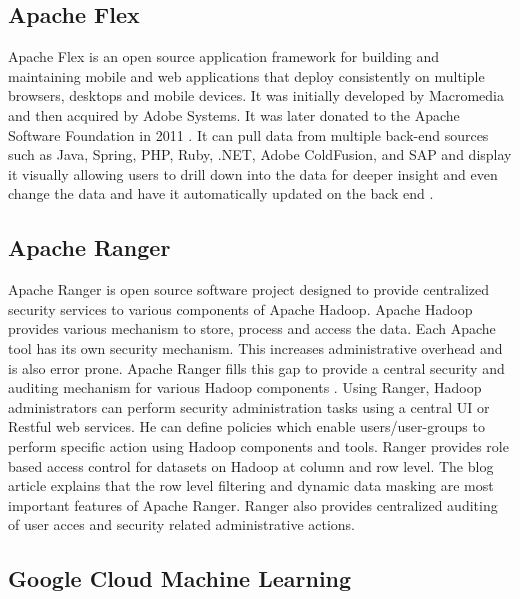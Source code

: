 \subsection{ Apache Flex}

     Apache Flex \cite{www-flex} is an open source application
     framework for building and maintaining mobile and web
     applications that deploy consistently on multiple browsers,
     desktops and mobile devices. It was initially developed by
     Macromedia and then acquired by Adobe Systems. It was later
     donated to the Apache Software Foundation in 2011
     \cite{blog-flex}. It can pull data from multiple back-end
     sources such as Java, Spring, PHP, Ruby, .NET, Adobe ColdFusion,
     and SAP and display it visually allowing users to drill down into
     the data for deeper insight and even change the data and have it
     automatically updated on the back end \cite{wiki-flex}.

\subsection{ Apache Ranger}

     Apache Ranger \cite{www-apache-ranger} is open source software project
     designed to provide centralized security services to various components
     of Apache Hadoop. Apache Hadoop provides various mechanism to store,
     process and access the data. Each Apache tool has its own security
     mechanism. This increases administrative overhead and is also error
     prone.  Apache Ranger fills this gap to provide a central security and
     auditing mechanism for various Hadoop components
     \cite{www-ranger-architecture}. Using Ranger, Hadoop administrators can
     perform security administration tasks using a central UI or Restful web
     services. He can define policies which enable users/user-groups to
     perform specific action using Hadoop components and tools. Ranger
     provides role based access control for datasets on Hadoop at column and
     row level.  The blog article \cite{www-ranger-key-features} explains
     that the row level filtering and dynamic data masking are most important
     features of Apache Ranger. Ranger also provides centralized auditing of
     user acces and security related administrative actions.
     
\subsection{ Google Cloud Machine Learning}
     
